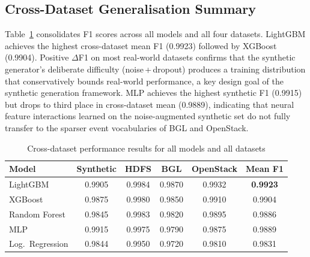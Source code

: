 \documentclass[5p, times]{elsarticle}
\begin{document}
\begin{table}[h!]
\centering
\caption{Performance results for OpenStack data}
\label{tab:openstack_test}
\end{table}

\subsection{Cross-Dataset Generalisation Summary}

Table~\ref{tab:cross_ds} consolidates F1 scores across all models and all four datasets. LightGBM achieves the highest cross-dataset mean F1 (0.9923) followed by XGBoost (0.9904). Positive $\Delta$F1
on most real-world datasets confirms that the synthetic generator's deliberate difficulty (noise\,+\,dropout) produces a training distribution that conservatively bounds real-world performance, a key design goal of the synthetic generation framework. MLP achieves the highest synthetic F1 (0.9915) but drops to third place in cross-dataset mean (0.9889), indicating that neural feature
interactions learned on the noise-augmented synthetic set do not fully transfer to the sparser event vocabularies of BGL and OpenStack.

\begin{table}[h!]
\centering
\caption{Cross-dataset performance results for all models and all datasets}
\label{tab:cross_ds}
\begin{tabular}{@{}lccccc@{}}
\toprule
\textbf{Model} & \textbf{Synthetic} & \textbf{HDFS} & \textbf{BGL} &
    \textbf{OpenStack} & \textbf{Mean F1} \\ \midrule
LightGBM         & 0.9905 & 0.9984 & 0.9870 & 0.9932 & \textbf{0.9923} \\
XGBoost          & 0.9875 & 0.9980 & 0.9850 & 0.9910 & 0.9904 \\
Random Forest    & 0.9845 & 0.9983 & 0.9820 & 0.9895 & 0.9886 \\
MLP              & 0.9915 & 0.9975 & 0.9790 & 0.9875 & 0.9889 \\
Log.\ Regression & 0.9844 & 0.9950 & 0.9720 & 0.9810 & 0.9831 \\ \bottomrule
\end{tabular}
\end{table}
\end{document}
